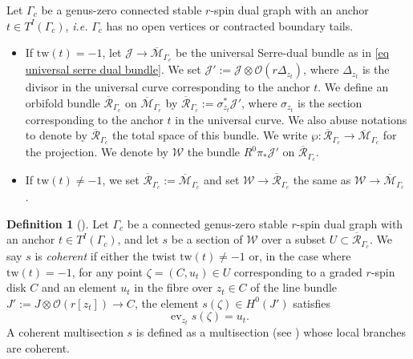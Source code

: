 \documentclass[11pt]{amsart}
\theoremstyle{definition}
\newtheorem{definition}[dummy]{Definition}
\theoremstyle{remark}
\newcommand{\tw}{\text{tw}}
\newcommand{\<}{\left<}
\renewcommand{\>}{\right>}
\numberwithin{equation}{section}
\def\Mbar{{\overline{\mathcal M}}}
\begin{document}
  Let $ \Gamma_c$ be a genus-zero connected stable $r$-spin dual graph with an anchor $t\in T^I(\Gamma_c)$, \textit{i.e.} $ \Gamma_c$  has no open vertices or contracted boundary tails.
  \begin{itemize}
      \item If $\tw(t)=-1$, let $\mathcal J\to \Mbar_{ \Gamma_c}$ be the universal Serre-dual bundle as %
in \eqref{eq universal serre dual bundle}. We set %
$\mathcal{J}' := \mathcal{J} \otimes \mathcal O \left( r\Delta_{z_t}\right)$, where $\Delta_{z_t}$ is the divisor in the universal curve corresponding to the anchor $t$.
    We define an orbifold bundle ${\overline{\mathcal{R}}}_{\Gamma_c}$ on $\Mbar_{ \Gamma_c}$ by
    ${\overline{\mathcal{R}}}_{ \Gamma_c}:= \sigma_{z_t}^*\mathcal{J}'$,
     where $\sigma_{z_t}$ is the section corresponding to the  anchor $t$ in the universal curve. We also abuse notations to denote by ${\overline{\mathcal{R}}}_{ \Gamma_c}$ the total space of this bundle. We write
$\wp: {\overline{\mathcal{R}}}_{ \Gamma_c} \to \Mbar_{ \Gamma_c}$ for the projection.     We denote by ${\mathcal{W}}$ the  bundle $R^0\pi_*\mathcal{J}'$ on ${\overline{\mathcal{R}}}_{\Gamma_c}$.
\item If $\tw(t)\ne -1$, we set ${\overline{\mathcal{R}}}_{ \Gamma_c}:=\Mbar_{\Gamma_c}$ and set $\mathcal W\to {\overline{\mathcal{R}}}_{ \Gamma_c}$ the same as $\mathcal W\to \Mbar_{\Gamma_c}$%
.
  \end{itemize}
  

\begin{definition}[{\cite[Def. 4.2]{BCT2}}]
\label{def coherent}
 Let %
$ \Gamma_c$ be a connected genus-zero stable $r$-spin dual graph with an anchor $t\in T^I(\Gamma_c)$, and let $s$ be a section of $\mathcal{W}$ over a subset $U\subset{\overline{\mathcal{R}}}_{\Gamma_c}$. We say $s$ is \textit{coherent} if either the twist %
$\tw(t)\ne -1$ or, %
in the case where $\tw(t)= -1$, for any point $\zeta=(C, u_t) \in U$  corresponding to a graded $r$-spin disk $C$ and an element $u_t$ in the fibre over $z_t\in C$ of the line bundle $J':=J\otimes \mathcal O(r[z_t])\to C$, the element $s(\zeta) \in H^0(J')$ satisfies
$$\operatorname{ev}_{z_t}s(\zeta) = u_t.$$ A coherent multisection $s$ is defined as a multisection  %
(see \cite[Appendix A]{BCT2}) whose %
local branches are coherent. 

\end{definition}
\end{document}
